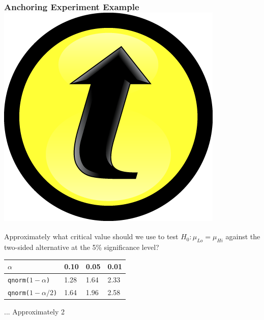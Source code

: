 \documentclass[handout]{beamer}
\begin{document}
\begin{frame}[t]
\frametitle{Anchoring Experiment Example \hfill \includegraphics[scale = 0.05]{./images/clicker}}
Approximately what critical value should we use to test $H_0\colon \mu_{Lo} = \mu_{Hi}$ against the two-sided alternative at the 5\% significance level?

\pause
\vspace{1em}
\begin{center}
\begin{tabular}{l|lll}
$\alpha$ &   0.10& 0.05 &0.01\\
\hline
\texttt{qnorm($1-\alpha$)} & 1.28 &1.64 &2.33\\
\texttt{qnorm($1-\alpha/2$)} &1.64 &\alert{1.96}& 2.58
\end{tabular}
\end{center}
\hfill \alert{... Approximately 2}
\end{frame}
\end{document}
